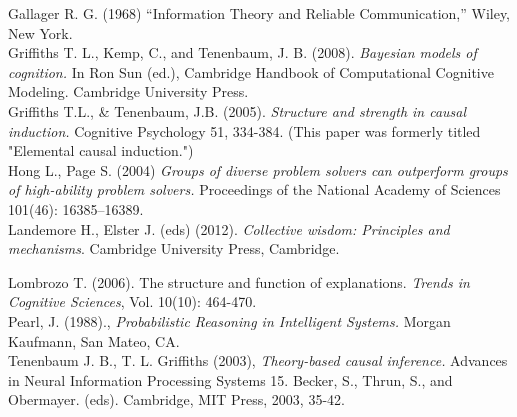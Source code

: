 \documentclass[12pt]{article}
\begin{document}
Gallager R. G. (1968) ``Information Theory and Reliable Communication,'' Wiley, New York.
\\

Griffiths T. L., Kemp, C., and Tenenbaum, J. B. (2008). \textit{Bayesian models of cognition.} In Ron Sun (ed.), Cambridge Handbook of Computational Cognitive Modeling. Cambridge University Press.
\\

Griffiths T.L., \& Tenenbaum, J.B. (2005). \textit{Structure and strength in causal induction.} Cognitive Psychology 51, 334-384. (This paper was formerly titled "Elemental causal induction.")
\\


Hong L., Page S. (2004) \textit{Groups of diverse problem solvers can outperform groups of high-ability problem solvers.} Proceedings of the National Academy of Sciences 101(46): 16385–16389.
\\
Landemore H., Elster J. (eds) (2012). \textit{Collective wisdom: Principles and mechanisms}. Cambridge University Press, Cambridge.

Lombrozo T. (2006). The structure and function of explanations. \textit{Trends in Cognitive Sciences}, Vol. 10(10): 464-470.
\\

Pearl, J. (1988)., \textit{Probabilistic Reasoning in Intelligent Systems.} Morgan Kaufmann, San Mateo, CA.
\\

Tenenbaum J. B., T. L. Griffiths (2003), \textit{Theory-based causal inference.} Advances in Neural Information Processing Systems 15. Becker, S., Thrun, S., and Obermayer. (eds). Cambridge, MIT Press, 2003, 35-42.
\\
\end{document}
